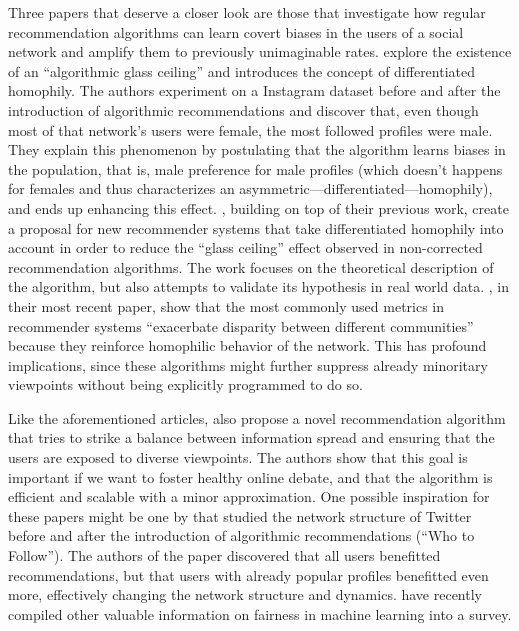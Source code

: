 Three papers that deserve a closer look are those that investigate how regular
recommendation algorithms can learn covert biases in the users of a social
network and amplify them to previously unimaginable rates.
\citet{stoica_algorithmic_2018} explore the existence of an ``algorithmic glass
ceiling'' and introduces the concept of differentiated homophily. The authors
experiment on a Instagram dataset before and after the introduction of
algorithmic recommendations and discover that, even though most of that
network's users were female, the most followed profiles were male. They explain
this phenomenon by postulating that the algorithm learns biases in the
population, that is, male preference for male profiles (which doesn't happens
for females and thus characterizes an asymmetric---differentiated---homophily),
and ends up enhancing this effect. \citet{stoica_hegemony_2019}, building on top
of their previous work, create a proposal for new recommender systems that take
differentiated homophily into account in order to reduce the ``glass ceiling''
effect observed in non-corrected recommendation algorithms. The work focuses on
the theoretical description of the algorithm, but also attempts to validate its
hypothesis in real world data. \citet{stoica_algorithmic_2020}, in their most
recent paper, show that the most commonly used metrics in recommender systems
``exacerbate disparity between different communities'' because they reinforce
homophilic behavior of the network. This has profound implications, since these
algorithms might further suppress already minoritary viewpoints without being
explicitly programmed to do so.

Like the aforementioned articles, \citet{matakos_maximizing_2020} also propose a
novel recommendation algorithm that tries to strike a balance between
information spread and ensuring that the users are exposed to diverse
viewpoints. The authors show that this goal is important if we want to foster
healthy online debate, and that the algorithm is efficient and scalable with a
minor approximation. One possible inspiration for these papers might be one by
\citet{su_effect_2016} that studied the network structure of Twitter before and
after the introduction of algorithmic recommendations (``Who to Follow''). The
authors of the paper discovered that all users benefitted recommendations, but
that users with already popular profiles benefitted even more, effectively
changing the network structure and dynamics. \citet{caton_fairness_2020} have
recently compiled other valuable information on fairness in machine learning
into a survey.

